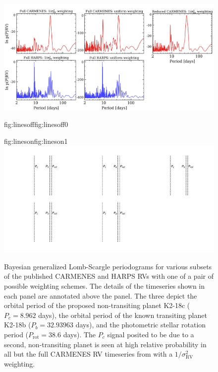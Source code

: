 \begin{figure}
  \centering
  \includegraphics[width=\hsize]{figures/periodograms1_bkgd.png}%
  \hspace{-\hsize}%
  \begin{ocg}{fig:linesoff}{fig:linesoff}{0}%
  \end{ocg}%
  \begin{ocg}{fig:lineson}{fig:lineson}{1}%
  \includegraphics[width=\hsize]{figures/periodograms1_lines.png}%
  \end{ocg}
  \hspace{-\hsize}%
  \caption[The sensitivity of the probability of the periodic signal $P_c=8.962$ days with different weighting
  schemes in HARPS and CARMENES.]
    {\small Bayesian generalized Lomb-Scargle periodograms for various subsets of the published CARMENES and HARPS RVs 
    with one of a pair of possible weighting schemes. The details of the timeseries shown in each panel are
    annotated above the panel. The three
     depict the orbital
    period of the proposed non-transiting planet K2-18c ($P_c=8.962$ days), the orbital period of the known
    transiting planet K2-18b ($P_b=32.93963$ days), and the photometric stellar rotation period
    ($P_{\text{rot}}=38.6$ days). The $P_c$ signal posited to be due to a second, non-transiting planet
    is seen at high relative probability in all but the full CARMENES RV timeseries from 
    with a $1/\sigma_{\text{RV}}^2$ weighting.}
  \label{k2182fig:glsp}
\end{figure}

